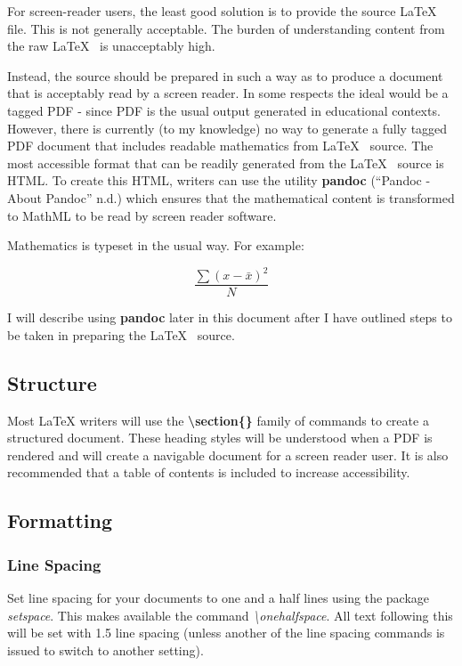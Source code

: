 \documentclass[]{article}
\begin{document}
For screen-reader users, the least good solution is to provide the source
\LaTeX~ file. This is not generally acceptable. The burden of
understanding content from the raw \LaTeX~ is unacceptably high.

Instead, the source should be prepared in such a way as to produce a
document that is acceptably read by a screen reader. In some respects
the ideal would be a tagged PDF - since PDF is the usual output
generated in educational contexts. However, there is currently (to my
knowledge) no way to generate a fully tagged PDF document that includes
readable mathematics from \LaTeX~ source. The most accessible format
that can be readily generated from the \LaTeX~ source is HTML.  To create this HTML, 
writers can use the utility \textbf{pandoc} (``Pandoc - About
Pandoc'' n.d.) which ensures that the mathematical content is
transformed to MathML to be read by screen reader software. 

Mathematics is typeset in the usual way. For example:

\[\frac{\sum{(x-\bar{x})^2}}{N}\]

I will describe using \textbf{pandoc} later in this document after I
have outlined steps to be taken in preparing the \LaTeX~ source.

\hypertarget{structure}{%
\subsection{Structure}\label{structure}}

Most LaTeX writers will use the \textbf{\textbackslash{}section\{\}}
family of commands to create a structured document. These heading styles
will be understood when a PDF is rendered and will create a navigable
document for a screen reader user. It is also recommended that a table
of contents is included to increase accessibility.

\hypertarget{formatting}{%
\subsection{Formatting}\label{formatting}}

\hypertarget{linespacing}{%
\subsubsection{Line Spacing}\label{linespacing}}

Set line spacing for your documents to one and a half lines using the package \emph{setspace}.  This makes available the command
\emph{\textbackslash onehalfspace}.  All text following this will be set with 1.5 line spacing (unless another
of the line spacing commands is issued to switch to another setting).
\end{document}
